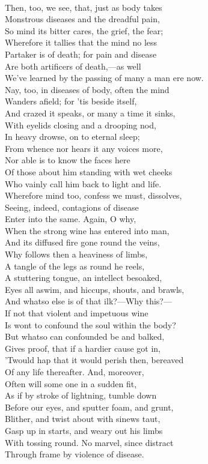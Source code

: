 \\
Then, too, we see, that, just as body takes\\
Monstrous diseases and the dreadful pain,\\
So mind its bitter cares, the grief, the fear;\\
Wherefore it tallies that the mind no less\\
Partaker is of death; for pain and disease\\
Are both artificers of death,—as well\\
We've learned by the passing of many a man ere now.\\
Nay, too, in diseases of body, often the mind\\
Wanders afield; for 'tis beside itself,\\
And crazed it speaks, or many a time it sinks,\\
With eyelids closing and a drooping nod,\\
In heavy drowse, on to eternal sleep;\\
From whence nor hears it any voices more,\\
Nor able is to know the faces here\\
Of those about him standing with wet cheeks\\
Who vainly call him back to light and life.\\
Wherefore mind too, confess we must, dissolves,\\
Seeing, indeed, contagions of disease\\
Enter into the same. Again, O why,\\
When the strong wine has entered into man,\\
And its diffused fire gone round the veins,\\
Why follows then a heaviness of limbs,\\
A tangle of the legs as round he reels,\\
A stuttering tongue, an intellect besoaked,\\
Eyes all aswim, and hiccups, shouts, and brawls,\\
And whatso else is of that ilk?—Why this?—\\
If not that violent and impetuous wine\\
Is wont to confound the soul within the body?\\
But whatso can confounded be and balked,\\
Gives proof, that if a hardier cause got in,\\
'Twould hap that it would perish then, bereaved\\
Of any life thereafter. And, moreover,\\
Often will some one in a sudden fit,\\
As if by stroke of lightning, tumble down\\
Before our eyes, and sputter foam, and grunt,\\
Blither, and twist about with sinews taut,\\
Gasp up in starts, and weary out his limbs\\
With tossing round. No marvel, since distract\\
Through frame by violence of disease.

